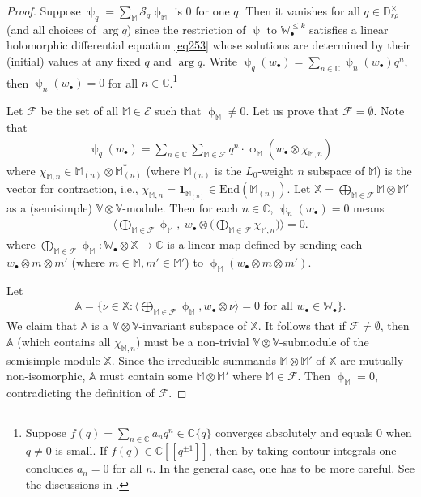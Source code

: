 \documentclass[11pt,b5paper,notitlepage]{article}
\theoremstyle{definition}
\theoremstyle{plain}
\newcommand{\mc}{\mathcal}
\newcommand{\End}{\mathrm{End}} %
\newcommand{\id}{\mathbf{1}}
\newcommand{\bigbk}[1]{\big\langle {#1}\big\rangle}
\newcommand{\Bigbk}[1]{\Big\langle {#1}\Big\rangle}
\newcommand{\blt}{\bullet}
\newcommand{\Vbb}{\mathbb V}
\newcommand{\Xbb}{\mathbb X}
\newcommand{\Abb}{\mathbb A}
\newcommand{\Wbb}{\mathbb W}
\newcommand{\Mbb}{\mathbb M}
\newcommand{\Cbb}{\mathbb C}
\newcommand{\Dbb}{\mathbb D}
\numberwithin{equation}{section}
\begin{document}
\begin{proof}
Suppose $\uppsi_q=\sum_\Mbb\mc S_q\upphi_\Mbb$ is $0$ for one $q$. Then it vanishes for all $q\in\Dbb_{r\rho}^\times$ (and all choices of $\arg q$) since the restriction of $\uppsi$ to $\Wbb_\blt^{\leq k}$ satisfies a linear holomorphic differential equation \eqref{eq253} whose solutions are determined by their (initial) values at any fixed $q$ and $\arg q$. Write $\uppsi_q(w_\blt)=\sum_{n\in\Cbb}\uppsi_n(w_\blt)q^n$, then $\uppsi_n(w_\blt)=0$ for all $n\in\Cbb$.\footnote{Suppose $f(q)=\sum_{n\in\Cbb}a_nq^n\in\Cbb\{q\}$ converges absolutely and equals $0$ when $q\neq 0$ is small. If $f(q)\in\Cbb[[q^{\pm1}]]$, then by taking contour integrals one concludes $a_n=0$ for all $n$. In the general case, one has to be more careful. See the discussions in \cite[Sec. 4.4]{Gui}.}

Let $\mc F$ be the set of all $\Mbb\in\mc E$ such that $\upphi_\Mbb\neq0$. Let us prove that $\mc F=\emptyset$. Note that
\begin{align*}
\uppsi_q(w_\blt)=\sum_{n\in\Cbb}\sum_{\Mbb\in\mc F}q^n\cdot \upphi_\Mbb(w_\blt\otimes \chi_{\Mbb,n})
\end{align*}
where $\chi_{\Mbb,n}\in\Mbb_{(n)}\otimes\Mbb_{(n)}^*$ (where $\Mbb_{(n)}$ is the $L_0$-weight $n$ subspace of $\Mbb$) is the vector for contraction, i.e., $\chi_{\Mbb,n}=\id_{\Mbb_{(n)}}\in\End(\Mbb_{(n)})$. Let $\Xbb=\bigoplus_{\Mbb\in\mc F}\Mbb\otimes\Mbb'$ as a (semisimple) $\Vbb\otimes\Vbb$-module. Then for each $n\in\Cbb$, $\uppsi_n(w_\blt)=0$ means 
\begin{align*}
\Bigbk{\bigoplus_{\Mbb\in\mc F}\upphi_\Mbb,~w_\blt\otimes \big(\bigoplus_{\Mbb\in\mc F} \chi_{\Mbb,n}\big)}=0.
\end{align*}
where $\bigoplus_{\Mbb\in\mc F}\upphi_\Mbb:\Wbb_\blt\otimes\Xbb\rightarrow\Cbb$ is a linear map defined by sending each $w_\blt\otimes m\otimes m'$ (where $m\in\Mbb,m'\in\Mbb'$) to $\upphi_\Mbb(w_\blt\otimes m\otimes m')$.

Let
\begin{align*}
\Abb=\big\{\nu\in\Xbb:\bigbk{\bigoplus_{\Mbb\in\mc F}\upphi_\Mbb,w_\blt\otimes\nu}=0\text{ for all }w_\blt\in\Wbb_\blt\big\}.
\end{align*}
We claim that $\Abb$ is a $\Vbb\otimes\Vbb$-invariant subspace of $\Xbb$. It follows that if $\mc F\neq\emptyset$, then $\Abb$ (which contains all $\chi_{\Mbb,n}$) must be a non-trivial $\Vbb\otimes\Vbb$-submodule of the semisimple module $\Xbb$. Since the irreducible summands $\Mbb\otimes\Mbb'$ of $\Xbb$ are mutually non-isomorphic,  $\Abb$ must contain some $\Mbb\otimes\Mbb'$ where $\Mbb\in\mc F$. Then $\upphi_\Mbb=0$, contradicting the definition of $\mc F$.


\end{proof}
\end{document}
